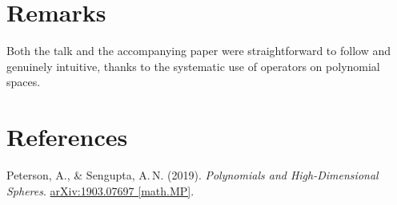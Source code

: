 \documentclass[11pt]{article}
\begin{document}
\section*{Remarks}

Both the talk and the accompanying paper were straightforward to follow and
genuinely intuitive, thanks to the systematic use of operators on polynomial
spaces.

\section*{References}

Peterson, A., \& Sengupta, A.\,N. (2019).
\emph{Polynomials and High-Dimensional Spheres}.
\href{https://arxiv.org/abs/1903.07697}{arXiv:1903.07697 [math.MP]}.
\end{document}
